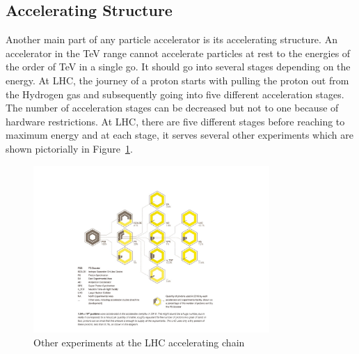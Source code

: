 \subsection{Accelerating Structure} %
\label{sub:accelerating_structure}

Another main part of any particle accelerator is its accelerating structure.
An accelerator in the TeV range cannot accelerate particles at rest to the energies of the order of TeV in a single go.
It should go into several stages depending on the energy.
At LHC, the journey of a proton starts with pulling the proton out from the Hydrogen gas and subsequently going into five different acceleration stages.
The number of acceleration stages can be decreased but not to one because of hardware restrictions.
At LHC, there are five different stages before reaching to maximum energy and at each stage, it serves several other experiments which are shown pictorially in Figure~\ref{fig:OtherExpAtAccStructure}.
\begin{figure}[!htbp]
	\centering
	\includegraphics[width=0.8\textwidth]{figures/LHC/distribution_of_protons_en.pdf}
	\caption{Other experiments at the LHC accelerating chain~\cite{Pralavorio2017}}
	\label{fig:OtherExpAtAccStructure}
\end{figure}

